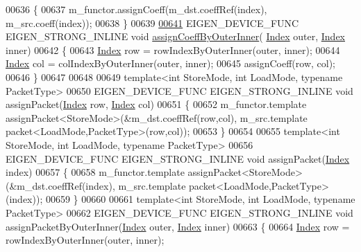 \begin{DoxyCode}
00636   \{
00637     m\_functor.assignCoeff(m\_dst.coeffRef(index), m\_src.coeff(index));
00638   \}
00639   
\hyperlink{class_eigen_1_1internal_1_1generic__dense__assignment__kernel_aff1bc113e270d4f895ca90570536303b}{00641}   EIGEN\_DEVICE\_FUNC EIGEN\_STRONG\_INLINE \textcolor{keywordtype}{void} \hyperlink{class_eigen_1_1internal_1_1generic__dense__assignment__kernel_aff1bc113e270d4f895ca90570536303b}{assignCoeffByOuterInner}(
      \hyperlink{namespace_eigen_a62e77e0933482dafde8fe197d9a2cfde}{Index} outer, \hyperlink{namespace_eigen_a62e77e0933482dafde8fe197d9a2cfde}{Index} inner)
00642   \{
00643     \hyperlink{namespace_eigen_a62e77e0933482dafde8fe197d9a2cfde}{Index} row = rowIndexByOuterInner(outer, inner); 
00644     \hyperlink{namespace_eigen_a62e77e0933482dafde8fe197d9a2cfde}{Index} col = colIndexByOuterInner(outer, inner); 
00645     assignCoeff(row, col);
00646   \}
00647   
00648   
00649   \textcolor{keyword}{template}<\textcolor{keywordtype}{int} StoreMode, \textcolor{keywordtype}{int} LoadMode, \textcolor{keyword}{typename} PacketType>
00650   EIGEN\_DEVICE\_FUNC EIGEN\_STRONG\_INLINE \textcolor{keywordtype}{void} assignPacket(\hyperlink{namespace_eigen_a62e77e0933482dafde8fe197d9a2cfde}{Index} row, \hyperlink{namespace_eigen_a62e77e0933482dafde8fe197d9a2cfde}{Index} col)
00651   \{
00652     m\_functor.template assignPacket<StoreMode>(&m\_dst.coeffRef(row,col), m\_src.template 
      packet<LoadMode,PacketType>(row,col));
00653   \}
00654   
00655   \textcolor{keyword}{template}<\textcolor{keywordtype}{int} StoreMode, \textcolor{keywordtype}{int} LoadMode, \textcolor{keyword}{typename} PacketType>
00656   EIGEN\_DEVICE\_FUNC EIGEN\_STRONG\_INLINE \textcolor{keywordtype}{void} assignPacket(\hyperlink{namespace_eigen_a62e77e0933482dafde8fe197d9a2cfde}{Index} index)
00657   \{
00658     m\_functor.template assignPacket<StoreMode>(&m\_dst.coeffRef(index), m\_src.template 
      packet<LoadMode,PacketType>(index));
00659   \}
00660   
00661   \textcolor{keyword}{template}<\textcolor{keywordtype}{int} StoreMode, \textcolor{keywordtype}{int} LoadMode, \textcolor{keyword}{typename} PacketType>
00662   EIGEN\_DEVICE\_FUNC EIGEN\_STRONG\_INLINE \textcolor{keywordtype}{void} assignPacketByOuterInner(\hyperlink{namespace_eigen_a62e77e0933482dafde8fe197d9a2cfde}{Index} outer, 
      \hyperlink{namespace_eigen_a62e77e0933482dafde8fe197d9a2cfde}{Index} inner)
00663   \{
00664     \hyperlink{namespace_eigen_a62e77e0933482dafde8fe197d9a2cfde}{Index} row = rowIndexByOuterInner(outer, inner); 

\end{DoxyCode}
